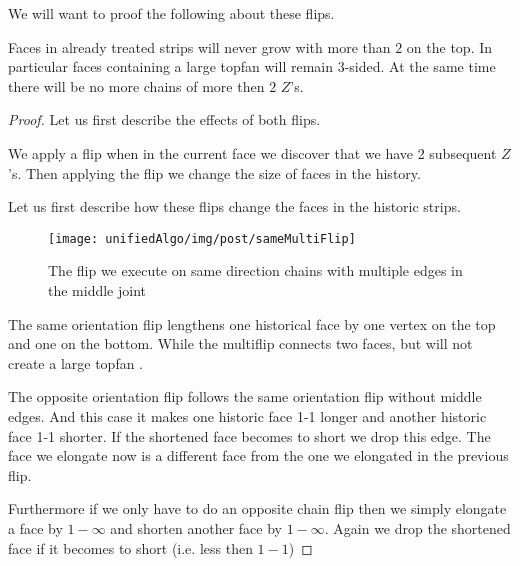 



  We will want to proof the following about these flips.

  \begin{lemma}
    \label{lm:}
    Faces in already treated strips will never grow with more than $2$ on the top. In particular faces containing a large topfan will remain 3-sided. At the same time there will be no more chains of more then $2$ $Z$'s.
  \end{lemma}

  \begin{proof}
    Let us first describe the effects of both flips.

    We apply a flip when in the current face we discover that we have 2 subsequent $Z$'s. Then applying the flip we change the size of faces in the history. 

    Let us first describe how these flips change the faces in the historic strips.
    \begin{figure}[h]
      \centering
      \texttt{[image: unifiedAlgo/img/post/sameMultiFlip]}
      \caption{The flip we execute on same direction chains with multiple edges in the middle joint}
      \label{fig:uni:sameMultiFlip}
    \end{figure}
    The same orientation flip lengthens one historical face by one vertex on the top and one on the bottom. While the multiflip connects two faces, but will not create a large topfan .

    The opposite orientation flip follows the same orientation flip without middle edges. And this case it makes one historic face 1-1 longer and another historic face 1-1 shorter. If the shortened face becomes to short we drop this edge.
    The face we elongate now is a different face from the one we elongated in the previous flip.

    Furthermore if we only have to do an opposite chain flip then we simply elongate a face by $1-\infty$ and shorten another face by $1-\infty$. Again we drop the shortened face if it becomes to short (i.e. less then $1-1$)


\end{proof}
